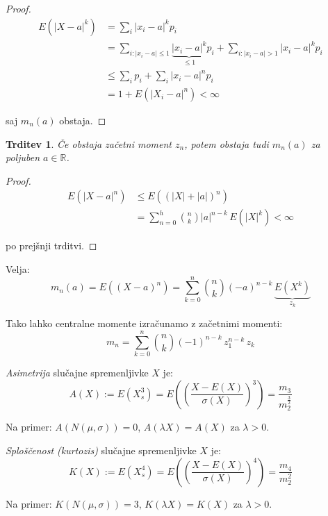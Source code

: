 \documentclass[12pt]{book}
\def\n{\noindent}
\def\s{\vspace{10pt}}
\theoremstyle{definition}
\theoremstyle{plain}
\theoremstyle{plain}
\newtheorem{trditev}{Trditev}
\theoremstyle{plain}
\theoremstyle{remark}
\begin{document}
\begin{proof}
    \begin{align*}
        E\left(|X-a|^k\right)&=\sum_i\left|x_i-a\right|^k  p_i \\
        &=\sum_{i: | x_i-a | \leq 1} \underbrace{\left|x_i-a\right|^k}_{\leq 1} p_i+\sum_{i: | x_i-a |  >1}\left|x_i-a\right|^k p_i \\
        &\leq \sum_i p_i+\sum_i\left|x_i-a\right|^n p_i \\
        &=1+E\left(\left|X_i-a\right|^n\right) < \infty
    \end{align*}

    saj $m_n(a)$ obstaja.
\end{proof}

\begin{trditev}
    Če obstaja začetni moment $z_n$, potem obstaja tudi $m_n(a)$ za poljuben $a \in \mathbb{R}$.
\end{trditev}

\begin{proof}
    \begin{align*}
        E\left(|X-a|^n\right) &\leq E\left((|X|+|a|)^n\right) \\
        &=\sum_{n=0}^h \binom{n}{k}|a|^{n-k} \, E\left(|X|^k\right) < \infty
    \end{align*}

    po prejšnji trditvi.
\end{proof}

\n Velja: 
$$
m_n(a)=E\left((X-a)^n\right)=\sum_{k=0}^n\binom{n}{k}(-a)^{n-k} \, \underbrace{E\left(X^k\right)}_{z_k}
$$

Tako lahko centralne momente izračunamo z začetnimi momenti: 
$$
m_n=\sum_{k=0}^n \binom{n}{k} (-1)^{n-k} \, z_1^{n-k} \, z_k
$$

\s 

\n \emph{Asimetrija} slučajne spremenljivke $X$ je: 
$$
A(X):=E\left(X_s^3\right)=E\left(\left(\frac{X-E(X)}{\sigma(X)}\right)^3\right)=\frac{m_3}{m_2^{\frac{3}{2}}}
$$
 
Na primer: $A(N(\mu, \sigma))=0$, $A(\lambda X)=A(X)$ za $\lambda >0$.

\s 

\n \emph{Sploščenost (kurtozis)} slučajne spremenljivke $X$ je:
$$
K(X):=E\left(X_s^4\right)=E\left(\left(\frac{X-E(X)}{\sigma(X)}\right)^4\right)=\frac{m_4}{m_2^2}
$$

Na primer: $K(N(\mu, \sigma))=3$, $K(\lambda X)=K(X)$ za $\lambda > 0$.

\s \s
\end{document}
